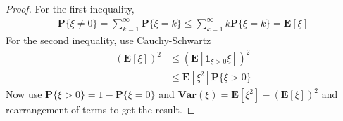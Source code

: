 \documentclass{amsbook}
\theoremstyle{definition}
\theoremstyle{remark}
\newcommand{\expectation}[1]{\textbf{E}\left[#1\right]}
\newcommand{\variance}[1]{\textbf{Var} \left (#1 \right )}
\newcommand{\probability}[1]{\textbf{P}\{#1\}}
\newcommand{\characteristic}[1]{\textbf{1}_{#1}}
\begin{document}
\begin{proof}
For the first inequality,
\begin{align*}
\probability{\xi \neq 0} = \sum_{k=1}^\infty \probability{\xi = k} \leq
\sum_{k=1}^\infty k\probability{\xi = k} = \expectation{\xi}
\end{align*}
For the second inequality, use Cauchy-Schwartz
\begin{align*}
\left(\expectation{\xi}\right)^2 &\leq
\left(\expectation{\characteristic{\xi > 0}\xi}\right)^2 \\
&\leq \expectation{\xi^2} \probability{\xi > 0}
\end{align*}
Now use $\probability{\xi > 0} = 1 - \probability{\xi=0}$ and
$\variance{\xi} = \expectation{\xi^2} -
\left(\expectation{\xi}\right)^2$ and rearrangement of terms to get
the result.
\end{proof}
\end{document}
